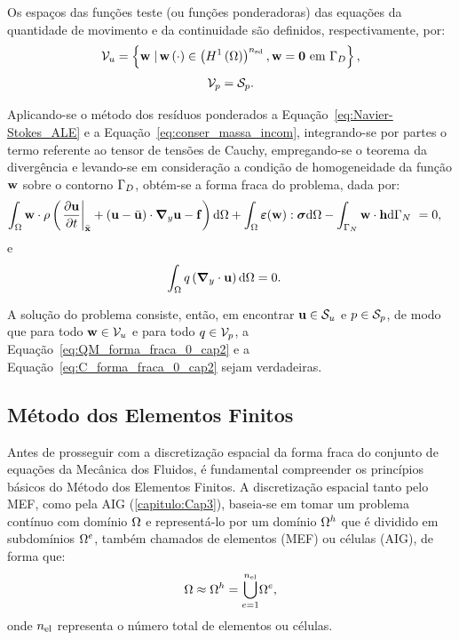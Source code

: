 Os espaços das funções teste (ou funções ponderadoras) das equações da quantidade de movimento e da continuidade são definidos, respectivamente, por:
\begin{align}
\mathcal{V}_u = \left\{\mathbf{w} \left . \right| \mathbf{w} \left(\cdot\right) \in \left(H^{1}\left(\Omega\right)\right)^{{n_{\mathrm{sd}}}}, \mathbf{w} = \mathbf{0} \textrm { em} \ \Gamma_{D} \right\},
\end{align}
\begin{align}
\mathcal{V}_p = \mathcal{S}_p.
\end{align}

Aplicando-se o método dos resíduos ponderados a Equação~\eqref{eq:Navier-Stokes_ALE} e a Equação~\eqref{eq:conser_massa_incom}, integrando-se por partes o termo referente ao tensor de tensões de Cauchy, empregando-se o teorema da divergência e levando-se em consideração a condição de homogeneidade da função $\mathbf{w}$ sobre o contorno $\Gamma_{D}$, obtém-se a forma fraca do problema, dada por:
\begin{align}
\int_{\Omega} \mathbf{w} \cdot \rho  \left(\left . \frac{\partial\mathbf{u}}{\partial t} \right|_{\bar{\mathbf{x}}} + \left(\mathbf{u} - \bar{\mathbf{u}} \right)\cdot\boldsymbol{\nabla}_y \mathbf{u} - \mathbf{f} \right) \mathrm{d} \Omega + \int_{\Omega} \bm{\varepsilon}(\mathbf{w}) : \boldsymbol{\sigma}  \mathrm{d} \Omega - \int_{\Gamma_{N}} \mathbf{w} \cdot \mathbf{h} \mathrm{d}\Gamma_{N}  \  &= 0,  \label{eq:QM_forma_fraca_0_cap2} 
\end{align}
\noindent e
\begin{align}
\int_{\Omega} q \left(\boldsymbol{\nabla}_y \cdot \mathbf{u}\right) \mathrm{d} \Omega &= 0. \label{eq:C_forma_fraca_0_cap2} 
\end{align}

A solução do problema consiste, então, em encontrar $\mathbf{u} \in \mathcal{S}_u$ e $p \in \mathcal{S}_p$, de modo que para todo $\mathbf{w} \in \mathcal{V}_u$ e para todo $q \in \mathcal{V}_p$, a Equação~\eqref{eq:QM_forma_fraca_0_cap2} e a Equação~\eqref{eq:C_forma_fraca_0_cap2} sejam verdadeiras.

\subsection{Método dos Elementos Finitos} \label{capitulo:Cap2:FormaFraca:ElementosFinitos}

Antes de prosseguir com a discretização espacial da forma fraca do conjunto de equações da Mecânica dos Fluidos, é fundamental compreender os princípios básicos do Método dos Elementos Finitos.  A discretização espacial tanto pelo MEF, como pela AIG (\autoref{capitulo:Cap3}), baseia-se em tomar um problema contínuo com domínio $\Omega$ e representá-lo por um domínio $\Omega^h$ que é dividido em subdomínios $\Omega^e$, também chamados de elementos (MEF) ou células (AIG), de forma que:
\begin{align}
	\Omega \approx \Omega^h = {\bigcup_{e = 1}^{n_{\mathrm{el}}}} \Omega^e,
\end{align}
\noindent onde $n_{\mathrm{el}}$ representa o número total de elementos ou células.

